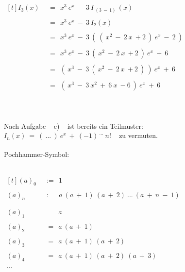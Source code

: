 	$\begin{aligned}[t]
	I_3(x) ~~ &= ~~ x^3 ~ e^x ~ - ~ 3 ~ I_{~ (3 ~ - ~ 1) ~}(x) \\ \\
	&= ~~ x^3 ~ e^x ~ - ~ 3 ~ I_{2}(x) \\ \\
	&= ~~ x^3 ~ e^x ~ - ~ 3 ~ \left( ~ \left( ~ x^2 ~ - ~ 2 ~ x ~ + 2 ~ \right) ~ e^x ~ - ~ 2 ~ \right) \\ \\
	&= ~~ x^3 ~ e^x ~ - ~ 3 ~ \left( ~ x^2 ~ - ~ 2 ~ x ~ + 2 ~ \right) ~ e^x ~ + ~ 6 \\ \\
	&= ~~ \left( ~ x^3 ~ - ~ 3 ~ \left( ~ x^2 ~ - ~ 2 ~ x ~ + 2 ~ \right) ~ \right) ~ e^x ~ + ~ 6 \\ \\
	&= ~~ \left( ~ x^3 ~ - ~ 3 ~ x^2 ~ + ~ 6 ~ x ~ - 6 ~ \right) ~ e^x ~ + ~ 6 \\ \\
	\end{aligned}$
	
	
	~\\
	
	\newpage
	
	Nach Aufgabe ~ c) ~ ist bereits ein Teilmuster: ~ $I_{n}(x) ~ = ~ ( ~ ... ~ ) ~ e^x ~ + ~ (-1)^{~ ...} ~ n!$ ~ zu vermuten. \\
	


	
	~\\ Pochhammer-Symbol:
	
	~\\
	
	$\begin{aligned}[t]
	(a)_0 ~~ &:= ~~ 1 \\ \\
	(a)_n ~~ &:= ~~ a ~ (a ~ + ~ 1) ~ (a ~ + ~ 2) ~ ... ~ (a ~ + ~ n ~ - ~ 1) \\ \\ \\
	(a)_1 ~~ &~= ~~ a \\ \\
	(a)_2 ~~ &~= ~~ a ~ (a ~ + ~ 1) \\ \\
	(a)_3 ~~ &~= ~~ a ~ (a ~ + ~ 1) ~ (a ~ + ~ 2) \\ \\
	(a)_4 ~~ &~= ~~ a ~ (a ~ + ~ 1) ~ (a ~ + ~ 2) ~ (a ~ + ~ 3) \\ \\
	...
	\end{aligned}$

